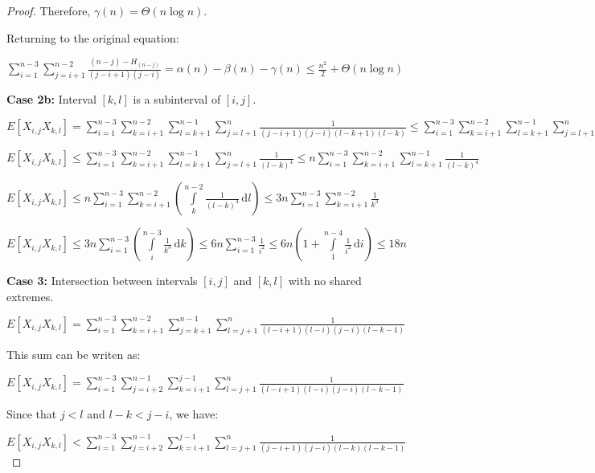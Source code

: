 \documentclass[12pt,letterpaper]{article}
\begin{document}
\begin{proof}
Therefore, $\gamma(n) = \Theta(n \log n)$.


Returning to the original equation:

$\sum\limits_{i=1}^{n-3} \sum\limits_{j=i+1}^{n-2} \frac{(n - j) - H_{(n - j)}} {(j-i+1)(j-i)} 
= \alpha(n) - \beta(n) - \gamma(n)
\leq  \frac{n^2}{2} + \Theta(n \log n)$

\vspace{0.5cm}

{\bf Case 2b:} Interval $[k, l]$ is a subinterval of $[i, j]$.

$E[X_{i,j} X_{k,l}] = \sum\limits_{i=1}^{n-3} \sum\limits_{k=i+1}^{n-2}
\sum\limits_{l=k+1}^{n-1} \sum\limits_{j=l+1}^{n} \frac{1}{(j-i+1)(j-i)(l-k+1)(l-k)}
\leq  \sum\limits_{i=1}^{n-3} \sum\limits_{k=i+1}^{n-2}
\sum\limits_{l=k+1}^{n-1} \sum\limits_{j=l+1}^{n} \frac{1}{(l-k+1)(l-k)(l-k+1)(l-k)}$

$E[X_{i,j} X_{k,l}] \leq\sum\limits_{i=1}^{n-3} \sum\limits_{k=i+1}^{n-2}
\sum\limits_{l=k+1}^{n-1} \sum\limits_{j=l+1}^{n} \frac{1}{(l-k)^4}
\leq n \sum\limits_{i=1}^{n-3} \sum\limits_{k=i+1}^{n-2}
\sum\limits_{l=k+1}^{n-1}  \frac{1}{(l-k)^4} $

$E[X_{i,j} X_{k,l}] \leq n \sum\limits_{i=1}^{n-3} \sum\limits_{k=i+1}^{n-2}
\left( \displaystyle \int\limits_{k}^{n-2} \! \frac{1}{(l-k)^4} \, \mathrm{d}l \right)
\leq 3n \sum\limits_{i=1}^{n-3} \sum\limits_{k=i+1}^{n-2} \frac{1}{k^3} $

$E[X_{i,j} X_{k,l}]  \leq 3n \sum\limits_{i=1}^{n-3}
\left( \displaystyle \int\limits_{i}^{n-3} \! \frac{1}{k^3} \, \mathrm{d}k \right)
\leq 6n \sum\limits_{i=1}^{n-3} \frac{1}{i^2}
 \leq 6n \left( 1 + \displaystyle \int\limits_{1}^{n-4} \! \frac{1}{i^2} \, \mathrm{d}i \right)
 \leq 18n$

\vspace{0.5cm}

{\bf Case 3:} Intersection between intervals $[i, j]$ and $[k, l]$ with no shared extremes.

$E[X_{i,j} X_{k,l}] = \sum\limits_{i=1}^{n-3} \sum\limits_{k=i+1}^{n-2}
\sum\limits_{j=k+1}^{n-1} \sum\limits_{l=j+1}^{n} \frac{1}{(l-i+1)(l-i)(j-i)(l-k-1)}$

This sum can be writen as:

$E[X_{i,j} X_{k,l}] = \sum\limits_{i=1}^{n-3} \sum\limits_{j=i+2}^{n-1}
\sum\limits_{k=i+1}^{j-1} \sum\limits_{l=j+1}^{n} \frac{1}{(l-i+1)(l-i)(j-i)(l-k-1)}$


Since that $j < l$ and $ l - k < j - i$, we have:

$E[X_{i,j} X_{k,l}] < \sum\limits_{i=1}^{n-3} \sum\limits_{j=i+2}^{n-1}
\sum\limits_{k=i+1}^{j-1} \sum\limits_{l=j+1}^{n} \frac{1}{(j-i+1)(j-i)(l-k)(l-k-1)}$


\end{proof}
\end{document}
